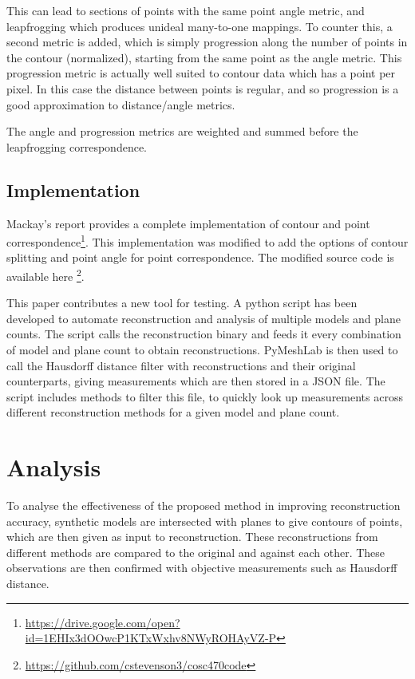 \documentclass[11p, titlepage]{article}
\begin{document}
This can lead to sections of points with the same point angle metric, and leapfrogging which produces unideal many-to-one mappings. To counter this, a second metric is added, which is simply progression along the number of points in the contour (normalized), starting from the same point as the angle metric. This progression metric is actually well suited to contour data which has a point per pixel. In this case the distance between points is regular, and so progression is a good approximation to distance/angle metrics. 

The angle and progression metrics are weighted and summed before the leapfrogging correspondence.

\subsection{Implementation}

Mackay's report provides a complete implementation of contour and point correspondence\footnote{\url{https://drive.google.com/open?id=1EHIx3dOOwcP1KTxWxhv8NWyROHAyVZ-P}}. This implementation was modified to add the options of contour splitting and point angle for point correspondence. The modified source code is available here \footnote{\url{https://github.com/cstevenson3/cosc470code}}.

This paper contributes a new tool for testing. A python script has been developed to automate reconstruction and analysis of multiple models and plane counts. The script calls the reconstruction binary and feeds it every combination of model and plane count to obtain reconstructions. PyMeshLab \cite{pymeshlab} is then used to call the Hausdorff distance filter with reconstructions and their original counterparts, giving measurements which are then stored in a JSON file. The script includes methods to filter this file, to quickly look up measurements across different reconstruction methods for a given model and plane count.

\section{Analysis}

To analyse the effectiveness of the proposed method in improving reconstruction accuracy, synthetic models are intersected with planes to give contours of points, which are then given as input to reconstruction. These reconstructions from different methods are compared to the original and against each other. These observations are then confirmed with objective measurements such as Hausdorff distance.
\end{document}
